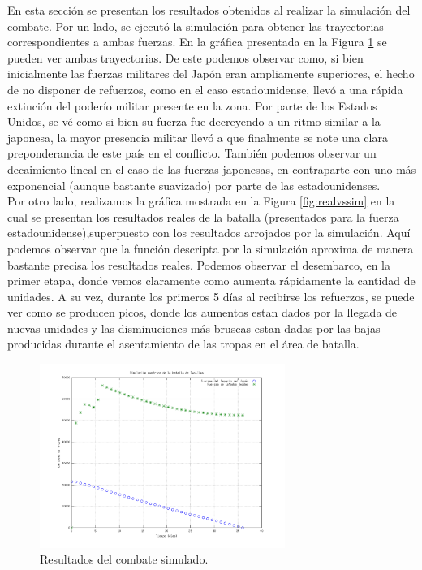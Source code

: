 \documentclass{sig-alternate}
\begin{document}
En esta sección se presentan los resultados obtenidos al realizar la simulación del combate. Por un lado, se ejecutó la simulación para obtener las 
trayectorias correspondientes a ambas fuerzas. En la gráfica presentada en la Figura \ref{fig:trays} se pueden ver ambas trayectorias. 
De este podemos observar como, si bien inicialmente las fuerzas militares del Japón eran ampliamente superiores, el hecho de no disponer de 
refuerzos, como en el caso estadounidense, llevó a una rápida extinción del poderío militar presente en la zona. Por parte de los 
Estados Unidos, se vé como si bien su fuerza fue decreyendo a un ritmo similar a la japonesa, la mayor presencia militar llevó a que finalmente
se note una clara preponderancia de este país en el conflicto. También podemos observar un decaimiento lineal en el caso de las fuerzas japonesas,
en contraparte con uno más exponencial (aunque bastante suavizado) por parte de las estadounidenses.\\
Por otro lado, realizamos la gráfica mostrada en la Figura \ref{fig:realvssim} en la cual se presentan los resultados reales de la batalla 
(presentados para la fuerza estadounidense),superpuesto con los resultados arrojados por la simulación. Aquí podemos observar que la función
descripta por la simulación aproxima de manera bastante precisa los resultados reales. Podemos observar el desembarco, en la primer etapa, 
donde vemos claramente como aumenta rápidamente la cantidad de unidades. A su vez, durante los primeros 5 días al recibirse los refuerzos, se
puede ver como se producen picos, donde los aumentos estan dados por la llegada de nuevas unidades y las disminuciones más bruscas estan dadas
por las bajas producidas durante el asentamiento de las tropas en el área de batalla.

\begin{figure}[h]
\begin{center}
\includegraphics[width=8cm]{jap_vs_usa.png}
\caption{\label{fig:trays}Resultados del combate simulado.}
\end{center}
\end{figure}
\end{document}
